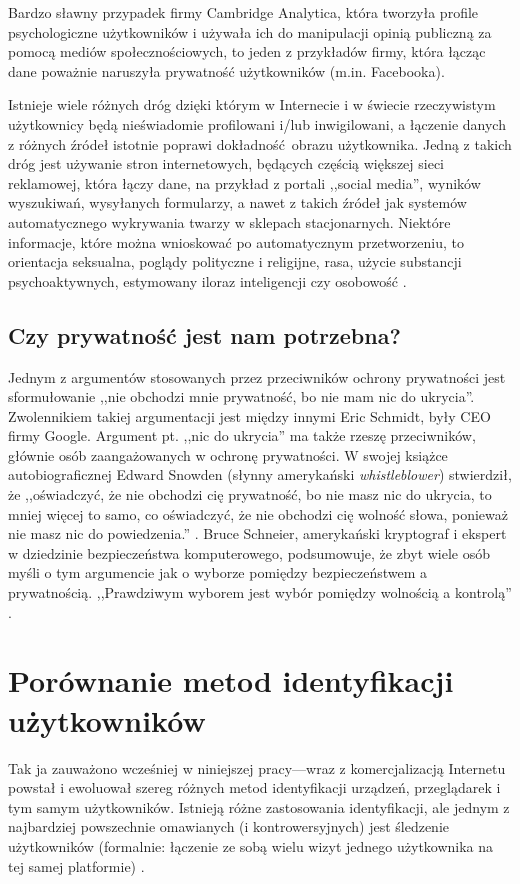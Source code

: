 Bardzo sławny przypadek firmy Cambridge Analytica, która tworzyła profile
psychologiczne użytkowników i używała ich do manipulacji opinią publiczną za
pomocą mediów społecznościowych, to jeden z przykładów firmy, która łącząc dane
poważnie naruszyła prywatność użytkowników (m.in. Facebooka).

Istnieje wiele różnych dróg dzięki którym w Internecie i w świecie rzeczywistym
użytkownicy będą nieświadomie profilowani i/lub inwigilowani, a łączenie danych
z różnych źródeł istotnie poprawi dokładność obrazu użytkownika. Jedną z takich
dróg jest używanie stron internetowych, będących częścią większej sieci
reklamowej, która łączy dane, na przykład z portali ,,social media'', wyników
wyszukiwań, wysyłanych formularzy, a nawet z takich źródeł jak systemów
automatycznego wykrywania twarzy w sklepach stacjonarnych. Niektóre informacje,
które można wnioskować po automatycznym przetworzeniu, to orientacja seksualna,
poglądy polityczne i religijne, rasa, użycie substancji psychoaktywnych,
estymowany iloraz inteligencji czy osobowość \cite{kosinski2013private}.

\subsection{Czy prywatność jest nam potrzebna?} %
Jednym z argumentów stosowanych przez przeciwników ochrony prywatności jest
sformułowanie ,,nie obchodzi mnie prywatność, bo nie mam nic do ukrycia''.
Zwolennikiem takiej argumentacji jest między innymi Eric Schmidt, były CEO firmy
Google. Argument pt. ,,nic do ukrycia'' ma także rzeszę przeciwników, głównie
osób zaangażowanych w ochronę prywatności. W swojej książce autobiograficznej
Edward Snowden (słynny amerykański \emph{whistleblower}) stwierdził, że
,,oświadczyć, że nie obchodzi cię prywatność, bo nie masz nic do ukrycia, to
mniej więcej to samo, co oświadczyć, że nie obchodzi cię wolność słowa, ponieważ
nie masz nic do powiedzenia.'' \cite{snowden2019pamiec}. Bruce Schneier,
amerykański kryptograf i ekspert w dziedzinie bezpieczeństwa komputerowego,
podsumowuje, że zbyt wiele osób myśli o tym argumencie jak o wyborze pomiędzy
bezpieczeństwem a prywatnością. ,,Prawdziwym wyborem jest wybór pomiędzy
wolnością a kontrolą'' \cite{schneier2006eternal}.

\section{Porównanie metod identyfikacji użytkowników}
Tak ja zauważono wcześniej w niniejszej pracy---wraz z komercjalizacją Internetu
powstał i ewoluował szereg różnych metod identyfikacji urządzeń, przeglądarek i
tym samym użytkowników. Istnieją różne zastosowania identyfikacji, ale jednym z
najbardziej powszechnie omawianych (i kontrowersyjnych) jest śledzenie
użytkowników (formalnie: łączenie ze sobą wielu wizyt jednego użytkownika na tej
samej platformie) \cite[s. 3]{al2020too}.

